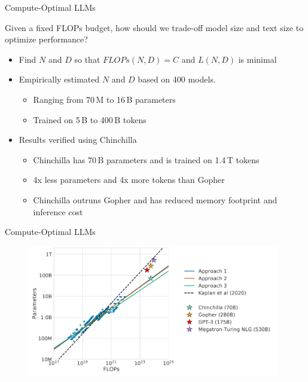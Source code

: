 \begin{vbframe}{Compute-Optimal LLM\MakeLowercase{s}}

Given a fixed FLOPs budget, how should we trade-off model size and text size to optimize performance? 

\vfill

\begin{itemize}

	\item Find $N$ and $D$ so that $FLOPs(N,D) = C$ and $L(N,D)$ is minimal

	\item Empirically estimated $N$ and $D$ based on 400 models. 
	\begin{itemize}
	\item Ranging from 70\,M to 16\,B parameters
	\item Trained on 5\,B to 400\,B tokens
	\end{itemize}

	\item Results verified using Chinchilla
	\begin{itemize}
	\item Chinchilla has 70\,B parameters and is trained on 1.4\,T tokens
	\item 4x less parameters and 4x more tokens than Gopher
	\item Chinchilla outruns Gopher and has reduced memory footprint and inference cost 
	\end{itemize}

\end{itemize}

\vfill

\end{vbframe}


\begin{vbframe}{Compute-Optimal LLM\MakeLowercase{s}}

\vfill

\begin{figure}
	\centering
	\includegraphics[width = 11cm]{./figure/chinchilla.png} \\ 
\end{figure}

\vfill

\end{vbframe}

